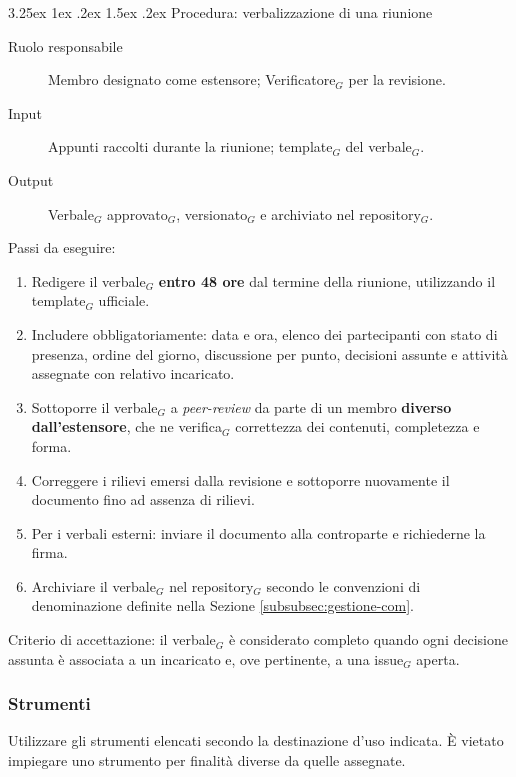 \documentclass[a4paper, 10pt]{article}
\makeatletter
\renewcommand\paragraph{\@startsection{paragraph}{4}{\z@}%
  {3.25ex \@plus1ex \@minus .2ex}%
  {1.5ex \@plus .2ex}%
  {\normalfont\normalsize\bfseries}}
\makeatother
\begin{document}
\paragraph{Procedura: verbalizzazione di una riunione}

\begin{description}
    \item[Ruolo responsabile] Membro designato come estensore; Verificatore$_G$ per la revisione.
    \item[Input] Appunti raccolti durante la riunione; template$_G$ del verbale$_G$.
    \item[Output] Verbale$_G$ approvato$_G$, versionato$_G$ e archiviato nel repository$_G$.
\end{description}

\noindent Passi da eseguire:
\begin{enumerate}
    \item Redigere il verbale$_G$ \textbf{entro 48 ore} dal termine della riunione, utilizzando il template$_G$ ufficiale.
    \item Includere obbligatoriamente: data e ora, elenco dei partecipanti con stato di presenza, ordine del giorno, discussione per punto, decisioni assunte e attività assegnate con relativo incaricato.
    \item Sottoporre il verbale$_G$ a \textit{peer-review} da parte di un membro \textbf{diverso dall'estensore}, che ne verifica$_G$ correttezza dei contenuti, completezza e forma.
    \item Correggere i rilievi emersi dalla revisione e sottoporre nuovamente il documento fino ad assenza di rilievi.
    \item Per i verbali esterni: inviare il documento alla controparte e richiederne la firma.
    \item Archiviare il verbale$_G$ nel repository$_G$ secondo le convenzioni di denominazione definite nella Sezione \ref{subsubsec:gestione-com}.
\end{enumerate}

\noindent Criterio di accettazione: il verbale$_G$ è considerato completo quando ogni decisione assunta è associata a un incaricato e, ove pertinente, a una issue$_G$ aperta.

\label{subsubsec:gestione-com}
\subsubsection{Strumenti}
Utilizzare gli strumenti elencati secondo la destinazione d'uso indicata. È vietato impiegare uno strumento per finalità diverse da quelle assegnate.
\end{document}
